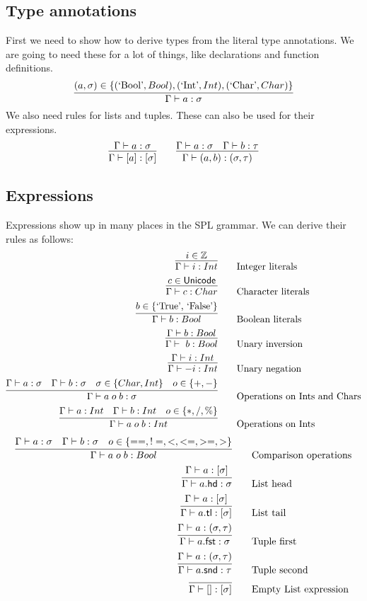 \subsection{Type annotations}
First we need to show how to derive types from the literal type annotations.
We are going to need these for a lot of things, like declarations and function definitions.
\[
\infer{\Gamma \vdash a : \sigma}{(a, \sigma) \in \{(\mbox{`Bool'}, Bool), (\mbox{`Int'}, Int), (\mbox{`Char'}, Char)\} }
\]
We also need rules for lists and tuples.
These can also be used for their expressions.
\[
\infer{\Gamma \vdash [a] : [\sigma]}{\Gamma \vdash a : \sigma}\qquad
\infer{\Gamma \vdash (a, b) : (\sigma, \tau)}{\Gamma \vdash a : \sigma & \Gamma \vdash b : \tau}
\]

\subsection{Expressions}
Expressions show up in many places in the SPL grammar.
We can derive their rules as follows:
\begin{align*}
    \infer{\Gamma \vdash i : Int}{i \in \mathbb{Z}} &\qquad \mbox{Integer literals} \\
    \infer{\Gamma \vdash c : Char}{c \in \mathsf{Unicode}} &\qquad \mbox{Character literals} \\
    \infer{\Gamma \vdash b : Bool}{b \in \{\mbox{`True', `False'}\}} &\qquad \mbox{Boolean literals} \\
    \infer{\Gamma \vdash ~b : Bool}{\Gamma \vdash b : Bool} &\qquad \mbox{Unary inversion}\\
    \infer{\Gamma \vdash -i : Int}{\Gamma \vdash i : Int} &\qquad \mbox{Unary negation}\\
    \infer{\Gamma \vdash a\; o\; b : \sigma}{\Gamma \vdash a : \sigma & \Gamma \vdash b : \sigma & \sigma \in \{Char, Int\} & o \in \{+, -\}} &\qquad \mbox{Operations on Ints and Chars}\\
    \infer{\Gamma \vdash a\; o\; b : Int}{\Gamma \vdash a : Int & \Gamma \vdash b : Int & o \in \{*, /, \% \}} &\qquad \mbox{Operations on Ints}\\
\end{align*}
\begin{align*}
    \infer{\Gamma \vdash a\; o\; b : Bool}{\Gamma \vdash a : \sigma & \Gamma \vdash b : \sigma & o \in \{==, !=, <, <=, >=, >\}} &\qquad \mbox{Comparison operations}\\
    \infer{\Gamma \vdash a\mathsf{.hd} : \sigma}{\Gamma \vdash a : [\sigma]} &\qquad \mbox{List head}\\
    \infer{\Gamma \vdash a\mathsf{.tl} : [\sigma]}{\Gamma \vdash a : [\sigma]} &\qquad \mbox{List tail}\\
    \infer{\Gamma \vdash a\mathsf{.fst} : \sigma}{\Gamma \vdash a : (\sigma, \tau)} &\qquad \mbox{Tuple first}\\
    \infer{\Gamma \vdash a\mathsf{.snd} : \tau}{\Gamma \vdash a : (\sigma, \tau)} &\qquad \mbox{Tuple second} \\
    \infer{\Gamma \vdash [] : [\sigma]}{} &\qquad \mbox{Empty List expression}
\end{align*}


